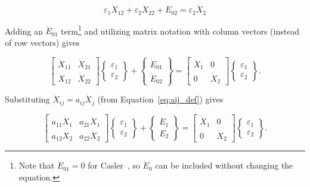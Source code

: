 \begin{equation} \label{eq:Casler-4}
	\varepsilon_{1} \dot{X}_{12}
	+ \varepsilon_{2} \dot{X}_{22}
	+ \dot{E}_{02}
	= \varepsilon_{2} \dot{X}_{2}
\end{equation}

\noindent{}Adding an $\dot{E}_{01}$ term\footnote{Note that 
$\dot{E}_{01} = 0$ for Casler~\cite{Casler1984}, 
so $\dot{E}_{0}$ can be included without changing the equation.} 
and utilizing matrix notation with column vectors 
(instead of row vectors) gives

\begin{equation} \label{eq:Casler34-matrix}
	\begin{bmatrix}
		\dot{X}_{11} & \dot{X}_{21} \\
		\dot{X}_{12} & \dot{X}_{22}
	\end{bmatrix}
	\begin{Bmatrix}
		\varepsilon_{1} \\
		\varepsilon_{2}
	\end{Bmatrix}
	+
	\begin{Bmatrix}
		\dot{E}_{01} \\
		\dot{E}_{02}
	\end{Bmatrix}
	=
	\begin{bmatrix}
		\dot{X}_{1} & 0 \\
		0           & \dot{X}_{2}
	\end{bmatrix}
	\begin{Bmatrix}
		\varepsilon_{1} \\
		\varepsilon_{2}
	\end{Bmatrix}.
\end{equation}

\noindent{}Substituting $\dot{X}_{ij} = a_{ij} \dot{X}_{j}$ (from 
Equation~\ref{eq:aij_def}) gives

\begin{equation} \label{eq:Casler34-matrix-with-a}
	\begin{bmatrix}
		a_{11} \dot{X}_{1} & a_{21} \dot{X}_{1} \\
		a_{12} \dot{X}_{2} & a_{22} \dot{X}_{2}
	\end{bmatrix}
	\begin{Bmatrix}
		\varepsilon_{1} \\
		\varepsilon_{2}
	\end{Bmatrix}
	+
	\begin{Bmatrix}
		E_{1} \\
		E_{2}
	\end{Bmatrix}
	=
	\begin{bmatrix}
		\dot{X}_{1} & 0 \\
		0           & \dot{X}_{2}
	\end{bmatrix}
	\begin{Bmatrix}
		\varepsilon_{1} \\
		\varepsilon_{2}
	\end{Bmatrix}.
\end{equation}

